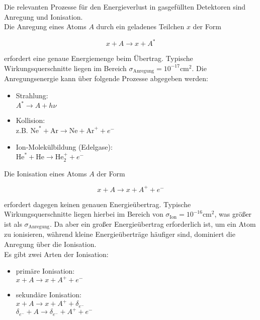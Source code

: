 Die relevanten Prozesse für den Energieverlust in gasgefüllten Detektoren sind Anregung und
Ionisation.
\\
Die Anregung eines Atoms $A$ durch ein geladenes Teilchen $x$ der Form

\[x+A \longrightarrow x+ A^*\]

erfordert eine genaue Energiemenge beim Übertrag. Typische Wirkungsquerschnitte liegen
im Bereich $\sigma_{\text{Anregung}}=10^{-17}\text{cm}^2$. Die Anregungsenergie kann über folgende Prozesse
abgegeben werden:

\begin{itemize}
  \item Strahlung:\\ $A^*\longrightarrow A+h\nu$
  \item Kollision:\\ z.B. $\text{Ne}^*+\text{Ar}\longrightarrow \text{Ne}+\text{Ar}^++e^-$
  \item Ion-Molekülbildung (Edelgase):\\ $\text{He}^*+\text{He} \longrightarrow\text{He}^+_2+e^-$
\end{itemize}

Die Ionisation eines Atoms $A$ der Form

\[x+A \longrightarrow x+ A^+ +e^- \]

erfordert dagegen keinen genauen Energieübertrag. Typische Wirkungsquerschnitte liegen hierbei im
Bereich von $\sigma_{\text{Ion}}=10^{-16}\text{cm}^2$, was größer ist als
$\sigma_{\text{Anregung}}$. Da aber ein großer Energieübertrag erforderlich ist, um ein Atom zu
ionisieren, während kleine Energieüberträge häufiger sind, dominiert die Anregung über die Ionisation.
\\
Es gibt zwei Arten der Ionisation:

\begin{itemize}
  \item primäre Ionisation:\\ $x+A \longrightarrow x+A^++e^-$
  \item sekundäre Ionisation:\\ $x+A \longrightarrow x+A^++\delta_{e^-}$ \\ $\delta_{e^-}+A \longrightarrow
  \delta_{e^-}+A^++e^-$
\end{itemize}
